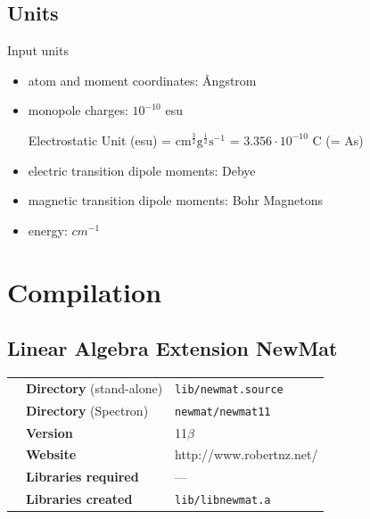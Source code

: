 \documentclass[11pt, letterpaper]{article}
\begin{document}


\subsection{Units}

Input units

\begin{itemize}
\item atom and moment coordinates: \AA ngstrom
\item monopole charges: $10^{-10}$ esu

Electrostatic Unit (esu)  = $\mbox{cm}^\frac{3}{2} \mbox{g}^\frac{1}{2} \mbox{s}^{-1}$ = $3.356\cdot10^{-10}$ C (= As) 

\item electric transition dipole moments: Debye
\item magnetic transition dipole moments: Bohr Magnetons
\item energy: $cm^{-1}$
\end{itemize}




\section{Compilation}

\subsection{Linear Algebra Extension NewMat}

\label{Sec:LinearAlgebraExtensions}

\begin{tabular}{p{0.5cm}p{6cm}p{10cm}}
 & \textbf{Directory} (stand-alone) & \verb'lib/newmat.source'  \\
 & \textbf{Directory} (Spectron)    & \verb'newmat/newmat11'    \\
 & \textbf{Version}                 & 11$\beta$                 \\
 & \textbf{Website}                 & http://www.robertnz.net/  \\
 & \textbf{Libraries required}      & ---                       \\
 & \textbf{Libraries created}       & \verb'lib/libnewmat.a'    \\
\end{tabular}
\end{document}
